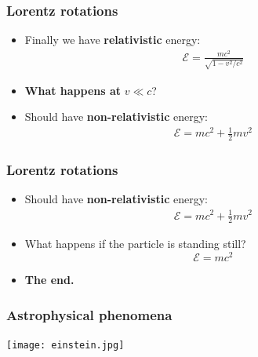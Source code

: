 \documentclass{beamer}
\begin{document}
\begin{frame}
  \frametitle{Lorentz rotations}
  \begin{itemize}
    \item<1-> Finally we have \textbf{relativistic} energy:
      \begin{gather*}
	\mathcal{  E}=\frac{mc^2}{\sqrt{1-v^2/c^2}}
      \end{gather*}
    \item<2-> \textbf{What happens at} $v\ll c$?
    \item<3-> Should have \textbf{non-relativistic} energy:
      \begin{gather*}
	\mathcal{  E}=mc^2+\frac{1}{2}mv^2
      \end{gather*}
  \end{itemize}
\end{frame}

\begin{frame}
  \frametitle{Lorentz rotations}
  \begin{itemize}
    \item<1-> Should have \textbf{non-relativistic} energy:
      \begin{gather*}
	\mathcal{  E}=mc^2+\frac{1}{2}mv^2
      \end{gather*}
    \item<2-> What happens if the particle is standing still?
      \begin{equation*}
	\mathcal{  E}=mc^2
      \end{equation*}
    \item<3-> \textbf{The end.}
  \end{itemize}
\end{frame}

\begin{frame}
  \center
  \frametitle{Astrophysical phenomena}
  \texttt{[image: einstein.jpg]}
\end{frame}
\end{document}
